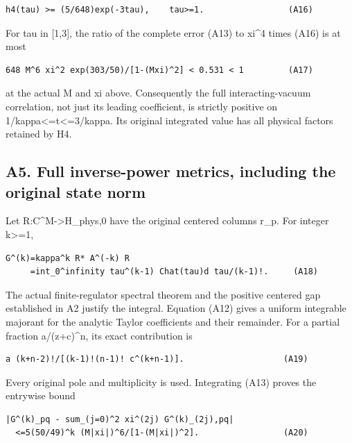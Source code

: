 \documentclass[11pt,a4paper]{article}
\renewcommand{\[}{\begingroup\small\originaldisplaystart}
\renewcommand{\]}{\originaldisplayend\endgroup}
\begin{document}
\begin{verbatim}
h4(tau) >= (5/648)exp(-3tau),    tau>=1.                 (A16)
\end{verbatim}

For tau in {[}1,3{]}, the ratio of the complete error (A13) to xi\^{}4
times (A16) is at most

\begin{verbatim}
648 M^6 xi^2 exp(303/50)/[1-(Mxi)^2] < 0.531 < 1         (A17)
\end{verbatim}

at the actual M and xi above. Consequently the full interacting-vacuum
correlation, not just its leading coefficient, is strictly positive on
{1\allowbreak{}/\allowbreak{}k\allowbreak{}a\allowbreak{}p\allowbreak{}p\allowbreak{}a\allowbreak{}\textless{}\allowbreak{}=\allowbreak{}t\allowbreak{}\textless{}\allowbreak{}=\allowbreak{}3\allowbreak{}/\allowbreak{}k\allowbreak{}a\allowbreak{}p\allowbreak{}p\allowbreak{}a\allowbreak{}.\allowbreak{}}
Its original integrated value has all physical factors retained by H4.

\subsection{A5. Full inverse-power metrics, including the original state
norm}\label{a5.-full-inverse-power-metrics-including-the-original-state-norm}

Let R:C\^{}M-\textgreater H\_phys,0 have the original centered columns
r\_p. For integer k\textgreater=1,

\begin{verbatim}
G^(k)=kappa^k R* A^(-k) R
     =int_0^infinity tau^(k-1) Chat(tau)d tau/(k-1)!.     (A18)
\end{verbatim}

The actual finite-regulator spectral theorem and the positive centered
gap established in A2 justify the integral. Equation (A12) gives a
uniform integrable majorant for the analytic Taylor coefficients and
their remainder. For a partial fraction a/(z+c)\^{}n, its exact
contribution is

\begin{verbatim}
a (k+n-2)!/[(k-1)!(n-1)! c^(k+n-1)].                    (A19)
\end{verbatim}

Every original pole and multiplicity is used. Integrating (A13) proves
the entrywise bound

\begin{verbatim}
|G^(k)_pq - sum_(j=0)^2 xi^(2j) G^(k)_(2j),pq|
  <=5(50/49)^k (M|xi|)^6/[1-(M|xi|)^2].                 (A20)
\end{verbatim}
\end{document}
